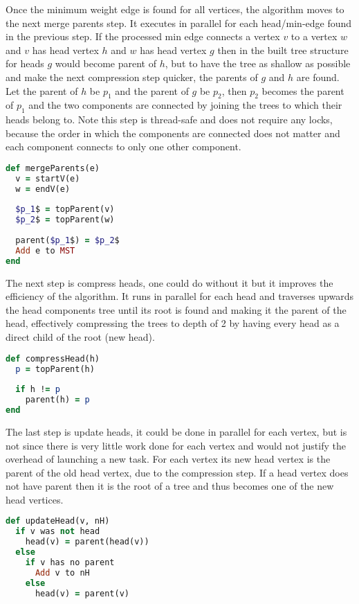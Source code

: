 \documentclass{report}
\theoremstyle{plain}
\theoremstyle{definition}
\theoremstyle{remark}
\begin{document}
Once the minimum weight edge is found for all vertices, the algorithm moves to the next merge parents step. It executes in parallel for each head/min-edge found in the previous step. If the processed min edge connects a vertex $v$ to a vertex $w$ and $v$ has head vertex $h$ and $w$ has head vertex $g$ then in the built tree structure for heads $g$ would become parent of $h$, but to have the tree as shallow as possible and make the next compression step quicker, the parents of $g$ and $h$ are found. Let the parent of $h$ be $p_1$ and the parent of $g$ be $p_2$, then $p_2$ becomes the parent of $p_1$ and the two components are connected by joining the trees to which their heads belong to. Note this step is thread-safe and does not require any locks, because the order in which the components are connected does not matter and each component connects to only one other component.

\begin{lstlisting}[language=Ruby, mathescape]
def mergeParents(e)
  v = startV(e)
  w = endV(e)
  
  $p_1$ = topParent(v)
  $p_2$ = topParent(w)
   
  parent($p_1$) = $p_2$
  Add e to MST 
end
\end{lstlisting}

The next step is compress heads, one could do without it but it improves the efficiency of the algorithm. It runs in parallel for each head and traverses upwards the head components tree until its root is found and making it the parent of the head, effectively compressing the trees to depth of 2 by having every head as a direct child of the root (new head).

\begin{lstlisting}[language=Ruby]
def compressHead(h)
  p = topParent(h)  
  
  if h != p
    parent(h) = p
end
\end{lstlisting}

The last step is update heads, it could be done in parallel for each vertex, but is not since there is very little work done for each vertex and would not justify the overhead of launching a new task. For each vertex its new head vertex is the parent of the old head vertex, due to the compression step. If a head vertex does not have parent then it is the root of a tree and thus becomes one of the new head vertices.

\begin{lstlisting}[language=Ruby]
def updateHead(v, nH)
  if v was not head
    head(v) = parent(head(v))
  else
    if v has no parent
      Add v to nH
    else
      head(v) = parent(v)
\end{lstlisting}
\end{document}
